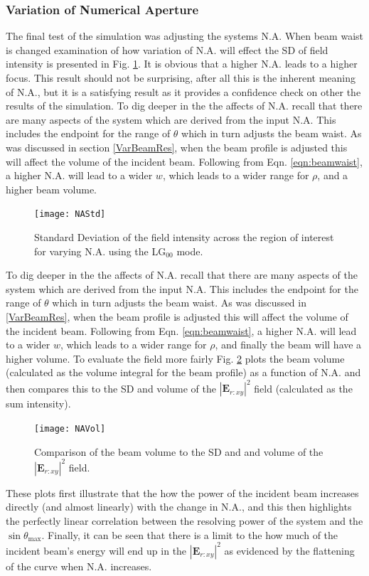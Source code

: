 \documentclass[12pt,a4paper]{article}
\begin{document}
\subsubsection{Variation of Numerical Aperture}
The final test of the simulation was adjusting the systems N.A. When beam waist is changed  examination of how variation of N.A. will effect the SD of field intensity is presented in Fig. \ref{NAstd}. It is obvious that a higher N.A. leads to a higher focus. This result should not be surprising, after all this is the inherent meaning of N.A., but it is a satisfying result as it provides a confidence check on other the results of the simulation. To dig deeper in the the affects of N.A. recall that there are many aspects of the system which are derived from the input N.A. This includes the endpoint for the range of $\theta$ which in turn adjusts the beam waist. As was discussed in section \ref{VarBeamRes}, when the beam profile is adjusted this will affect the volume of the incident beam. Following from Eqn. \ref{eqn:beamwaist}, a higher N.A. will lead to a wider $w$, which leads to a wider range for $\rho$, and a higher beam volume. 

\begin{figure}[ht]
\centering\texttt{[image: NAStd]}
\caption{Standard Deviation of the field intensity across the region of interest for varying N.A. using the LG$_{00}$ mode.}
\label{NAstd}
\end{figure}

To dig deeper in the the affects of N.A. recall that there are many aspects of the system which are derived from the input N.A. This includes the endpoint for the range of $\theta$ which in turn adjusts the beam waist. As was discussed in \ref{VarBeamRes}, when the beam profile is adjusted this will affect the volume of the incident beam. Following from Eqn. \ref{eqn:beamwaist}, a higher N.A. will lead to a wider $w$, which leads to a wider range for $\rho$, and finally the beam will have a higher volume. To evaluate the field more fairly Fig. \ref{NAVol} plots the beam volume (calculated as the volume integral for the beam profile) as a function of N.A. and then compares this to the SD and volume of the $|\textbf{E}_{r:xy}|^2$ field (calculated as the sum intensity).

\begin{figure}[ht]
\centering\texttt{[image: NAVol]}
\caption{Comparison of the beam volume to the SD and and volume of the $|\textbf{E}_{r:xy}|^2$ field.}
\label{NAVol}
\end{figure}
These plots first illustrate that the how the power of the incident beam increases directly (and almost linearly) with the change in N.A., and this then highlights the perfectly linear correlation between the resolving power of the system and the $\sin\theta_\text{max}$. Finally, it can be seen that there is a limit to the how much of the incident beam's energy will end up in the $|\textbf{E}_{r:xy}|^2$ as evidenced by the flattening of the curve when N.A. increases.
\pagebreak
\pagebreak
\end{document}
